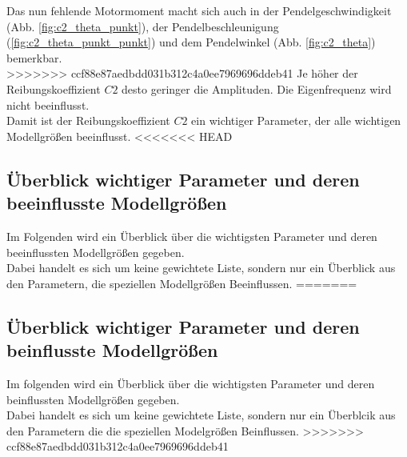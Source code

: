 Das nun fehlende Motormoment macht sich auch in der Pendelgeschwindigkeit (Abb. \ref{fig:c2_theta_punkt}), der Pendelbeschleunigung (\ref{fig:c2_theta_punkt_punkt}) und dem Pendelwinkel (Abb. \ref{fig:c2_theta}) bemerkbar.\\
>>>>>>> ccf88e87aedbdd031b312c4a0ee7969696ddeb41
Je höher der Reibungskoeffizient $C2$ desto geringer die Amplituden.
Die Eigenfrequenz wird nicht beeinflusst.\\

Damit ist der Reibungskoeffizient $C2$ ein wichtiger Parameter, der alle wichtigen Modellgrößen beeinflusst.
\pagebreak
<<<<<<< HEAD
\subsection*{Überblick wichtiger Parameter und deren beeinflusste Modellgrößen}
Im Folgenden wird ein Überblick über die wichtigsten Parameter und deren beeinflussten Modellgrößen gegeben.\\
Dabei handelt es sich um keine gewichtete Liste, sondern nur ein Überblick aus den Parametern, die speziellen Modellgrößen Beeinflussen.
=======
\subsection*{Überblick wichtiger Parameter und deren beinflusste Modellgrößen}
Im folgenden wird ein Überblick über die wichtigsten Parameter und deren beinflussten Modellgrößen gegeben.\\
Dabei handelt es sich um keine gewichtete Liste, sondern nur ein Überblcik aus den Parametern die die speziellen Modelgrößen Beinflussen.
>>>>>>> ccf88e87aedbdd031b312c4a0ee7969696ddeb41


